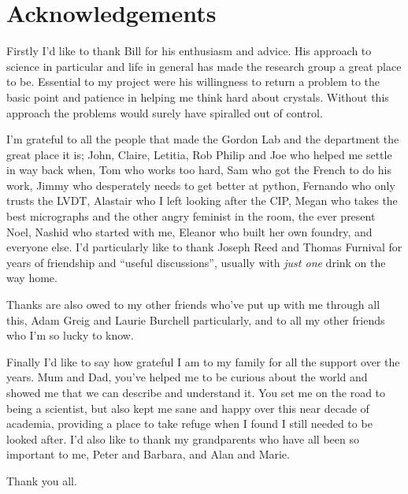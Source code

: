\clearpage

\doublespacing

\section*{Acknowledgements}


Firstly I'd like to thank Bill for his enthusiasm and advice. His approach to science in particular and life in general has made the research group a great place to be. Essential to my project were his willingness to return a problem to the basic point and patience in helping me think hard about crystals. Without this approach the problems would surely have spiralled out of control.


I'm grateful to all the people that made the Gordon Lab and the department the great place it is; John, Claire, Letitia, Rob Philip and Joe who helped me settle in way back when, Tom who works too hard, Sam who got the French to do his work, Jimmy who desperately needs to get better at python, Fernando who only trusts the LVDT, Alastair who I left looking after the CIP, Megan who takes the best micrographs and the other angry feminist in the room, the ever present Noel, Nashid who started with me, Eleanor who built her own foundry, and everyone else. 
I'd particularly like to thank Joseph Reed and Thomas Furnival for years of friendship and ``useful discussions'', usually with \emph{just one} drink on the way home.

Thanks are also owed to my other friends who've put up with me through all this, Adam Greig and Laurie Burchell particularly, and to all my other friends who I'm so lucky to know.

Finally I'd like to say how grateful I am to my family for all the support over the years.
Mum and Dad, you've helped me to be curious about the world and showed me that we can describe and understand it. You set me on the road to being a scientist, but also kept me sane and happy over this near decade of academia, providing a place to take refuge when I found I still needed to be looked after. I'd also like to thank my grandparents who have all been so important to me, Peter and Barbara, and Alan and Marie.


Thank you all.

























































